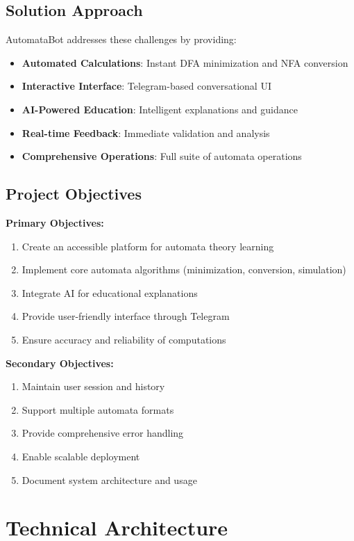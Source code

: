 \documentclass[12pt]{article}
\begin{document}
\subsection{Solution Approach}
AutomataBot addresses these challenges by providing:
\begin{itemize}
    \item \textbf{Automated Calculations}: Instant DFA minimization and NFA conversion
    \item \textbf{Interactive Interface}: Telegram-based conversational UI
    \item \textbf{AI-Powered Education}: Intelligent explanations and guidance
    \item \textbf{Real-time Feedback}: Immediate validation and analysis
    \item \textbf{Comprehensive Operations}: Full suite of automata operations
\end{itemize}

\subsection{Project Objectives}
\textbf{Primary Objectives:}
\begin{enumerate}
    \item Create an accessible platform for automata theory learning
    \item Implement core automata algorithms (minimization, conversion, simulation)
    \item Integrate AI for educational explanations
    \item Provide user-friendly interface through Telegram
    \item Ensure accuracy and reliability of computations
\end{enumerate}
\textbf{Secondary Objectives:}
\begin{enumerate}
    \item Maintain user session and history
    \item Support multiple automata formats
    \item Provide comprehensive error handling
    \item Enable scalable deployment
    \item Document system architecture and usage
\end{enumerate}

\section{Technical Architecture}
\end{document}
